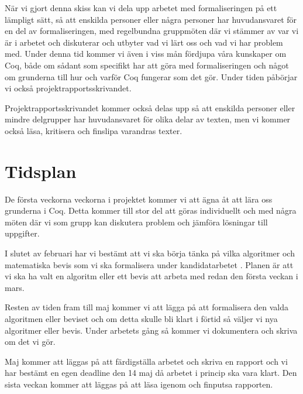 \documentclass[a4paper]{article}
\begin{document}
När vi gjort denna skiss kan vi dela upp arbetet med formaliseringen på ett
lämpligt sätt, så att enskilda personer eller några personer har huvudansvaret
för en del av formaliseringen, med regelbundna gruppmöten där vi stämmer av var
vi är i arbetet och diskuterar och utbyter vad vi lärt oss och vad vi har
problem med. Under denna tid kommer vi även i viss mån fördjupa våra kunskaper
om Coq, både om sådant som specifikt har att göra med formaliseringen och något
om grunderna till hur och varför Coq fungerar som det gör. Under tiden påbörjar
vi också projektrapportsskrivandet.

Projektrapportsskrivandet kommer också delas upp så att enskilda personer eller
mindre delgrupper har huvudansvaret för olika delar av texten, men vi kommer
också läsa, kritisera och finslipa varandras texter.

\section*{Tidsplan}

De första veckorna veckorna i projektet kommer vi att ägna åt att lära oss
grunderna i Coq. Detta kommer till stor del att göras individuellt och med
några möten där vi som grupp kan diskutera problem och jämföra lösningar till
uppgifter.

I slutet av februari har vi bestämt att vi ska börja tänka på vilka algoritmer
och matematiska bevis som vi ska formalisera under kandidatarbetet . Planen är
att vi ska ha valt en algoritm eller ett bevis att arbeta med redan den första
veckan i mars.

Resten av tiden fram till maj kommer vi att lägga på att formalisera den valda
algoritmen eller beviset och om detta skulle bli klart i förtid så väljer vi
nya algoritmer eller bevis. Under arbetets gång så kommer vi dokumentera och
skriva om det vi gör.

Maj kommer att läggas på att färdigställa arbetet och skriva en rapport och vi
har bestämt en egen deadline den 14 maj då arbetet i princip ska vara klart.
Den sista veckan kommer att läggas på att läsa igenom och finputsa rapporten.
\end{document}
